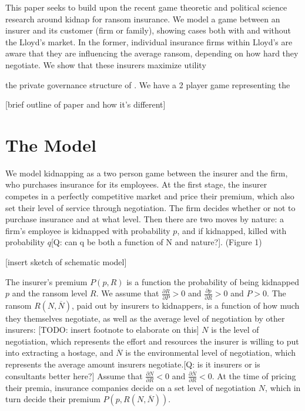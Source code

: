 \documentclass[12pt]{article}
\begin{document}
This paper seeks to build upon the recent game theoretic and political science research around kidnap for ransom insurance. We model a game between an insurer and its customer (firm or family), showing cases both with and without the Lloyd's market. In the former, individual insurance firms within Lloyd's are aware that they are influencing the average ransom, depending on how hard they negotiate. We show that these insurers maximize utility

 the private governance structure of . We have a 2 player game representing the 

[brief outline of paper and how it's different]


\section{The Model}

We model kidnapping as a two person game between the insurer and the firm, who purchases insurance for its employees. At the first stage, the insurer competes in a perfectly competitive market and price their premium, which also set their level of service through negotiation. The firm decides whether or not to purchase insurance and at what level. Then there are two moves by nature: a firm's employee is kidnapped with probability $p$, and if kidnapped, killed with probability $q$[Q: can q be both a function of N and nature?]. (Figure 1)

[insert sketch of schematic model]

The insurer's premium $P(p, R)$ is a function the probability of being kidnapped $p$ and the ransom level $R$. We assume that $\frac{\partial R}{\partial P} > 0$ and $\frac{\partial p}{\partial R} > 0$ and $P > 0$. The ransom $R(N, \overline{N})$, paid out by insurers to kidnappers, is a function of how much they themselves negotiate, as well as the average level of negotiation by other insurers: [TODO: insert footnote to elaborate on this] $N$ is the level of negotiation, which represents the effort and resources the insurer is willing to put into extracting a hostage, and $\overline{N}$ is the environmental level of negotiation, which represents the average amount insurers negotiate.[Q: is it insurers or is consultants better here?] Assume that $\frac{\partial N}{\partial R} < 0$ and $\frac{\partial \overline{N}}{\partial R} < 0$. At the time of pricing their premia, insurance companies decide on a set level of negotiation $N$, which in turn decide their premium $P(p, R(N, \overline{N}))$.
\end{document}
